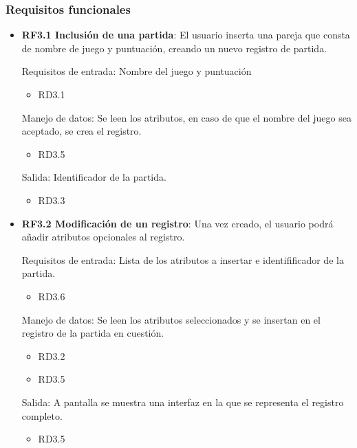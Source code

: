 \subsubsection{Requisitos funcionales}

\begin{itemize}

	\item \textbf{RF3.1 Inclusión de una partida}: El usuario inserta una pareja que consta de nombre de juego y puntuación, creando un nuevo registro de partida.

	Requisitos de entrada: Nombre del juego y puntuación
	\begin{itemize}
		\item RD3.1
	\end{itemize}

	Manejo de datos: Se leen los atributos, en caso de que el nombre del juego sea aceptado, se crea el registro.
	\begin{itemize}
		\item RD3.5
	\end{itemize}

	Salida: Identificador de la partida.
	\begin{itemize}
		\item RD3.3
	\end{itemize}

	\item \textbf{RF3.2 Modificación de un registro}: Una vez creado, el usuario podrá añadir atributos opcionales al registro.

	Requisitos de entrada: Lista de los atributos a insertar e identifificador de la partida.\\
	\begin{itemize}
		\item RD3.6
	\end{itemize}

	Manejo de datos: Se leen los atributos seleccionados y se insertan en el registro de la partida en cuestión. \\
	\begin{itemize}
		\item RD3.2
		\item RD3.5
	\end{itemize}

	Salida: A pantalla se muestra una interfaz en la que se representa el registro completo.
	\begin{itemize}
		\item RD3.5
	\end{itemize}


\end{itemize}
